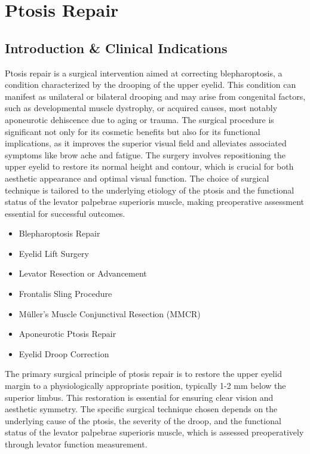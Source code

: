 \chapter{Ptosis Repair}

\section*{Introduction \& Clinical Indications}
Ptosis repair is a surgical intervention aimed at correcting blepharoptosis, a condition characterized by the drooping of the upper eyelid. This condition can manifest as unilateral or bilateral drooping and may arise from congenital factors, such as developmental muscle dystrophy, or acquired causes, most notably aponeurotic dehiscence due to aging or trauma. The surgical procedure is significant not only for its cosmetic benefits but also for its functional implications, as it improves the superior visual field and alleviates associated symptoms like brow ache and fatigue. The surgery involves repositioning the upper eyelid to restore its normal height and contour, which is crucial for both aesthetic appearance and optimal visual function. The choice of surgical technique is tailored to the underlying etiology of the ptosis and the functional status of the levator palpebrae superioris muscle, making preoperative assessment essential for successful outcomes.

\begin{itemize}
  \item Blepharoptosis Repair
  \item Eyelid Lift Surgery
  \item Levator Resection or Advancement
  \item Frontalis Sling Procedure
  \item M\"uller's Muscle Conjunctival Resection (MMCR)
  \item Aponeurotic Ptosis Repair
  \item Eyelid Droop Correction
\end{itemize}

The primary surgical principle of ptosis repair is to restore the upper eyelid margin to a physiologically appropriate position, typically 1-2 mm below the superior limbus. This restoration is essential for ensuring clear vision and aesthetic symmetry. The specific surgical technique chosen depends on the underlying cause of the ptosis, the severity of the droop, and the functional status of the levator palpebrae superioris muscle, which is assessed preoperatively through levator function measurement.

